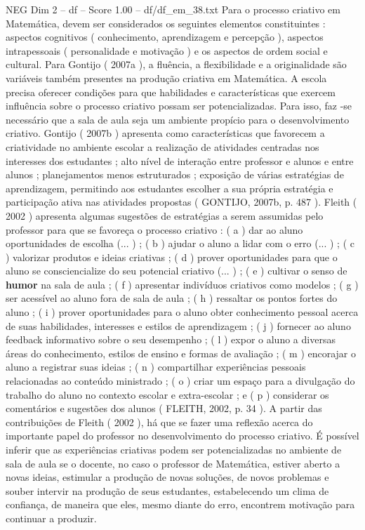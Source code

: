 \begin{textsample}{NEG Dim 2 – df – Score 1.00 – df/df\_em\_38.txt}
Para o processo criativo em Matemática, devem ser considerados os seguintes elementos constituintes : aspectos cognitivos ( conhecimento, aprendizagem e percepção ), aspectos intrapessoais ( personalidade e motivação ) e os aspectos de ordem social e cultural.
Para Gontijo ( 2007a ), a fluência, a flexibilidade e a originalidade são variáveis também presentes na produção criativa em Matemática.
A escola precisa oferecer condições para que habilidades e características que exercem influência sobre o processo criativo possam ser potencializadas.
Para isso, faz -se necessário que a sala de aula seja um ambiente propício para o desenvolvimento criativo.
Gontijo ( 2007b ) apresenta como características que favorecem a criatividade no ambiente escolar a realização de atividades centradas nos interesses dos estudantes ; alto nível de interação entre professor e alunos e entre alunos ; planejamentos menos estruturados ; exposição de várias estratégias de aprendizagem, permitindo aos estudantes escolher a sua própria estratégia e participação ativa nas atividades propostas ( GONTIJO, 2007b, p. 487 ).
Fleith ( 2002 ) apresenta algumas sugestões de estratégias a serem assumidas pelo professor para que se favoreça o processo criativo : ( a ) dar ao aluno oportunidades de escolha (... ) ; ( b ) ajudar o aluno a lidar com o erro (... ) ; ( c ) valorizar produtos e ideias criativas ; ( d ) prover oportunidades para que o aluno se consciencialize do seu potencial criativo (... ) ; ( e ) cultivar o senso de \textbf{humor} na sala de aula ; ( f ) apresentar indivíduos criativos como modelos ; ( g ) ser acessível ao aluno fora de sala de aula ; ( h ) ressaltar os pontos fortes do aluno ; ( i ) prover oportunidades para o aluno obter conhecimento pessoal acerca de suas habilidades, interesses e estilos de aprendizagem ; ( j ) fornecer ao aluno feedback informativo sobre o seu desempenho ; ( l ) expor o aluno a diversas áreas do conhecimento, estilos de ensino e formas de avaliação ; ( m ) encorajar o aluno a registrar suas ideias ; ( n ) compartilhar experiências pessoais relacionadas ao conteúdo ministrado ; ( o ) criar um espaço para a divulgação do trabalho do aluno no contexto escolar e extra-escolar ; e ( p ) considerar os comentários e sugestões dos alunos ( FLEITH, 2002, p. 34 ).
A partir das contribuições de Fleith ( 2002 ), há que se fazer uma reflexão acerca do importante papel do professor no desenvolvimento do processo criativo.
É possível inferir que as experiências criativas podem ser potencializadas no ambiente de sala de aula se o docente, no caso o professor de Matemática, estiver aberto a novas ideias, estimular a produção de novas soluções, de novos problemas e souber intervir na produção de seus estudantes, estabelecendo um clima de confiança, de maneira que eles, mesmo diante do erro, encontrem motivação para continuar a produzir.

\end{textsample}
